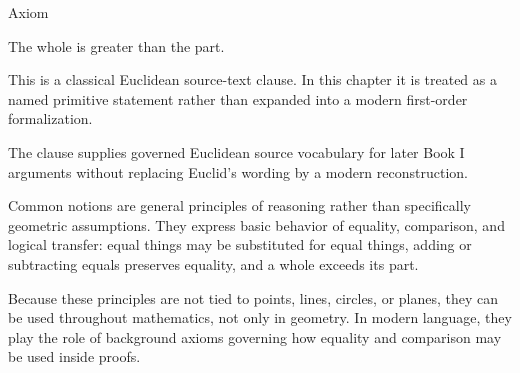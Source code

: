 \begin{lra-not-visible}
\NoLocalDependencies
\end{lra-not-visible}

\begin{axiombox}{Axiom}
\begin{axiom}
\label{ax:euclid-common-notion-whole-greater-than-part}
The whole is greater than the part.
\end{axiom}
\end{axiombox}
\begin{remark*}
This is a classical Euclidean source-text clause. In this chapter it is treated
as a named primitive statement rather than expanded into a modern first-order
formalization.
\end{remark*}

\begin{remark*}[Interpretation]
The clause supplies governed Euclidean source vocabulary for later Book I
arguments without replacing Euclid's wording by a modern reconstruction.
\end{remark*}

\begin{lra-not-visible}
\NoLocalDependencies
\end{lra-not-visible}

\begin{remark*}[Exposition]
Common notions are general principles of reasoning rather than specifically
geometric assumptions. They express basic behavior of equality, comparison, and
logical transfer: equal things may be substituted for equal things, adding or
subtracting equals preserves equality, and a whole exceeds its part.

Because these principles are not tied to points, lines, circles, or planes,
they can be used throughout mathematics, not only in geometry. In modern
language, they play the role of background axioms governing how equality and
comparison may be used inside proofs.
\end{remark*}
